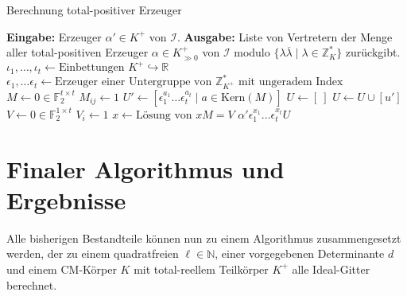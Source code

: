 \documentclass[12pt,a4paper,halfparskip,headsepline,bibtotocnumbered]{scrreprt}
\theoremstyle{nummermitklammern}
\theoremstyle{nonumberbreak}
\newcommand{\N}{\mathbb{N}}
\newcommand{\Z}{\mathbb{Z}}
\newcommand{\R}{\mathbb{R}}
\newcommand{\F}{\mathbb{F}}
\newcommand{\I}{\mathcal{I}}
\newcommand{\Kern}{\text{Kern}}
\begin{document}
\begin{algorithm}[H]
	\caption{Berechnung total-positiver Erzeuger}\label{alg:posgen}
	\begin{algorithmic}[1]
		\State \textbf{Eingabe:} Erzeuger $\alpha' \in K^+$ von $\I$.
		\State \textbf{Ausgabe:} Liste von Vertretern der Menge aller total-positiven Erzeuger $\alpha \in K_{\gg 0}^+$ von $\I$ modulo $\lbrace \lambda \overline{\lambda} \mid \lambda \in \Z_K^\ast \rbrace$ zurückgibt.
		\\
		\State $\iota_1, \dots, \iota_t \gets \text{Einbettungen } K^+ \hookrightarrow \R$
		\State $\epsilon_1, \dots \epsilon_t \gets \text{Erzeuger einer Untergruppe von } \Z_{K^+}^\ast \text{ mit ungeradem Index}$
		\State $M \gets 0 \in \F_2^{t \times t}$
				\State $M_{ij} \gets 1$
			\EndIf
		\EndFor
		\State $U' \gets \left[ \epsilon_1^{a_1} \dots \epsilon_t^{a_t} \mid a \in \Kern(M) \right]$
		\State $U \gets \left[ \ \right]$
			\If {$u' \neq u \lambda \overline{\lambda} \text{ für alle } u \in U, \lambda \in \Z_K^\ast$}
				\State $U \gets U \cup \left[ u' \right]$
			\EndIf
		\EndFor
		\State $V \gets 0 \in \F_2^{1 \times t}$
				\State $V_i \gets 1$
			\EndIf
		\EndFor
		\State $x \gets \text{Lösung von } xM = V$
		\State \Return $\alpha'\epsilon_1^{x_1} \dots \epsilon_t^{x_t} U$
	\end{algorithmic}
\end{algorithm}

\section{Finaler Algorithmus und Ergebnisse}

Alle bisherigen Bestandteile können nun zu einem Algorithmus zusammengesetzt werden, der zu einem quadratfreien $\ell \in \N$, einer vorgegebenen Determinante $d$ und einem CM-Körper $K$ mit total-reellem Teilkörper $K^+$ alle Ideal-Gitter berechnet.
\end{document}

